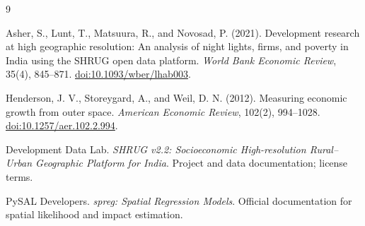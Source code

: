 \documentclass[11pt]{article}
\begin{document}
\clearpage
\begin{thebibliography}{9}

Asher, S., Lunt, T., Matsuura, R., and Novosad, P. (2021).
Development research at high geographic resolution: An analysis of night
lights, firms, and poverty in India using the SHRUG open data platform.
\emph{World Bank Economic Review}, 35(4), 845--871.
\href{https://doi.org/10.1093/wber/lhab003}{doi:10.1093/wber/lhab003}.

Henderson, J. V., Storeygard, A., and Weil, D. N. (2012).
Measuring economic growth from outer space.
\emph{American Economic Review}, 102(2), 994--1028.
\href{https://doi.org/10.1257/aer.102.2.994}{doi:10.1257/aer.102.2.994}.

Development Data Lab. \emph{SHRUG v2.2: Socioeconomic High-resolution Rural--Urban Geographic Platform for India}.
Project and data documentation; license terms.

PySAL Developers. \emph{spreg: Spatial Regression Models}.
Official documentation for spatial likelihood and impact estimation.

\end{thebibliography}
\end{document}

